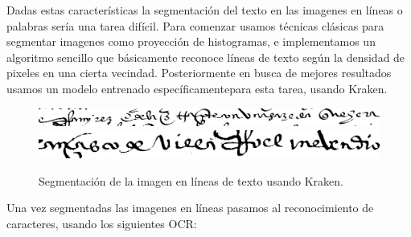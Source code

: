 \documentclass[11pt,a4paper]{article}
\begin{document}
Dadas estas características la segmentación del texto en las imagenes en líneas o palabras sería una tarea difícil. Para comenzar usamos técnicas clásicas para segmentar imagenes como proyección de histogramas, e implementamos un algoritmo sencillo que básicamente reconoce líneas de texto según la densidad de pixeles en una cierta vecindad. Posteriormente en busca de mejores resultados usamos un modelo entrenado específicamentepara esta tarea, usando Kraken.

\begin{figure}[h]
  \centering
  \begin{minipage}{1.0\textwidth}
  \begin{minipage}[t]{0.45\textwidth}
  \includegraphics[width=\textwidth]{line_1.png}\\[2em]
  \includegraphics[width=\textwidth]{line_3.png}
  \end{minipage}
  \hfill
  \caption{Segmentación de la imagen en líneas de texto usando Kraken.}
  \label{fig:tresfotosmodelos}
  \end{minipage}
  \end{figure}

Una vez segmentadas las imagenes en líneas pasamos al reconocimiento de caracteres, usando los siguientes OCR:
\end{document}
